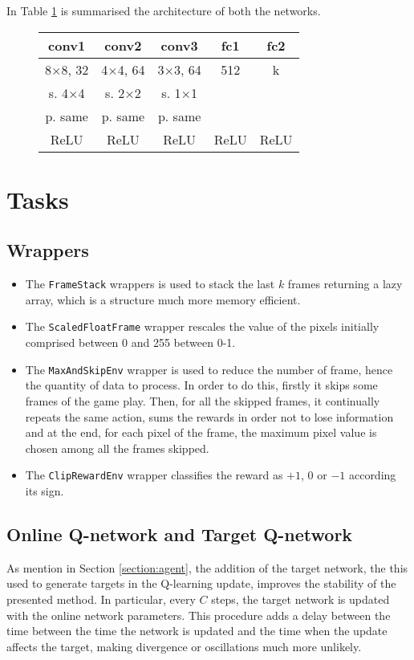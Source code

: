 \documentclass[a4paper,12pt]{article} %
\begin{document}
	In Table \ref{tab:arc} is summarised the architecture of both the networks. 
	
	\begin{figure}[htb]
		\centering
		
		\begin{tabular}{ccccc}
			\toprule
			\textbf{conv1} & \textbf{conv2} & \textbf{conv3} & \textbf{fc1} &
			\textbf{fc2} \\
			\midrule
			8$\times$8,  32 & 4$\times$4, 64 & 3$\times$3, 64 & 512 & k\\
			s. 4$\times$4 &   s. 2$\times$2 &   s. 1$\times$1 &  & \\
			p. same & p. same & p. same &&\\
			ReLU & ReLU & ReLU & ReLU & ReLU  \\
			\bottomrule
		\end{tabular}
		\label{tab:arc}
	\end{figure}
	
	\section{Tasks}
	\label{section:tasks}
	
	\subsection*{Wrappers}
	\begin{itemize}
		\item The \texttt{FrameStack} wrappers is used to stack the last $k$ frames returning a lazy array, which is a structure much more memory efficient.
		\item The \texttt{ScaledFloatFrame} wrapper rescales the value of the pixels initially comprised between 0 and 255 between 0-1.
		\item The \texttt{MaxAndSkipEnv} wrapper is used to reduce the number of frame, hence the quantity of data to process. In order to do this, firstly it skips some frames of the game play. Then, for all the skipped frames, it continually repeats the same action, sums the rewards in order not to lose information and at the end, for each pixel of the frame, the maximum pixel value is chosen among all the frames skipped.
		\item The \texttt{ClipRewardEnv} wrapper classifies the reward as $+1$, $0$ or $-1$ according its sign.
	\end{itemize}
	
	
	\subsection*{Online Q-network and Target Q-network}	
	As mention in Section \ref{section:agent}, the addition of the target network, the this used to generate targets in the Q-learning update, improves the stability of the presented method. In particular, every $C$ steps, the target network is updated with the online network parameters.
	This procedure adds a delay between the time between the time the network is updated and the time when the update affects the target, making divergence or oscillations much more unlikely.
	
\end{document}
